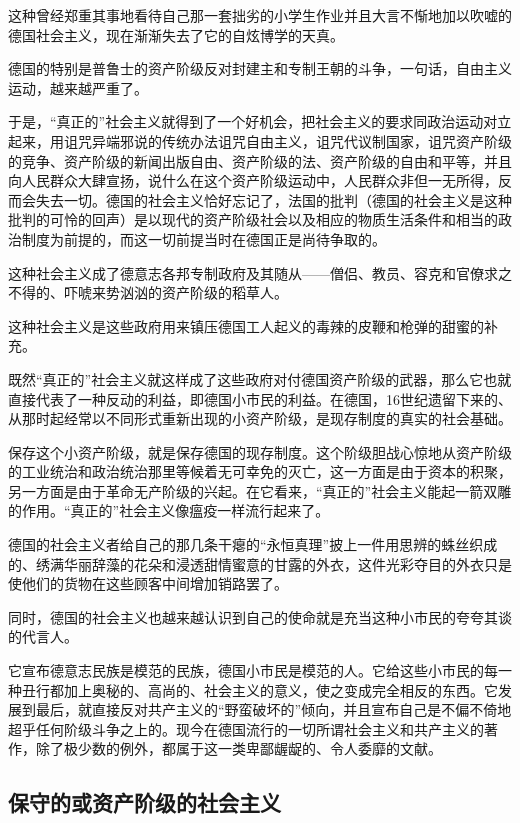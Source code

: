 \documentclass[10pt, UTF8]{book} %
\begin{document}
这种曾经郑重其事地看待自己那一套拙劣的小学生作业并且大言不惭地加以吹嘘的德国社会主义，现在渐渐失去了它的自炫博学的天真。

德国的特别是普鲁士的资产阶级反对封建主和专制王朝的斗争，一句话，自由主义运动，越来越严重了。

于是，“真正的”社会主义就得到了一个好机会，把社会主义的要求同政治运动对立起来，用诅咒异端邪说的传统办法诅咒自由主义，诅咒代议制国家，诅咒资产阶级的竞争、资产阶级的新闻出版自由、资产阶级的法、资产阶级的自由和平等，并且向人民群众大肆宣扬，说什么在这个资产阶级运动中，人民群众非但一无所得，反而会失去一切。德国的社会主义恰好忘记了，法国的批判（德国的社会主义是这种批判的可怜的回声）是以现代的资产阶级社会以及相应的物质生活条件和相当的政治制度为前提的，而这一切前提当时在德国正是尚待争取的。

这种社会主义成了德意志各邦专制政府及其随从——僧侣、教员、容克和官僚求之不得的、吓唬来势汹汹的资产阶级的稻草人。

这种社会主义是这些政府用来镇压德国工人起义的毒辣的皮鞭和枪弹的甜蜜的补充。

既然“真正的”社会主义就这样成了这些政府对付德国资产阶级的武器，那么它也就直接代表了一种反动的利益，即德国小市民的利益。在德国，16世纪遗留下来的、从那时起经常以不同形式重新出现的小资产阶级，是现存制度的真实的社会基础。

保存这个小资产阶级，就是保存德国的现存制度。这个阶级胆战心惊地从资产阶级的工业统治和政治统治那里等候着无可幸免的灭亡，这一方面是由于资本的积聚，另一方面是由于革命无产阶级的兴起。在它看来，“真正的”社会主义能起一箭双雕的作用。“真正的”社会主义像瘟疫一样流行起来了。

德国的社会主义者给自己的那几条干瘪的“永恒真理”披上一件用思辨的蛛丝织成的、绣满华丽辞藻的花朵和浸透甜情蜜意的甘露的外衣，这件光彩夺目的外衣只是使他们的货物在这些顾客中间增加销路罢了。

同时，德国的社会主义也越来越认识到自己的使命就是充当这种小市民的夸夸其谈的代言人。

它宣布德意志民族是模范的民族，德国小市民是模范的人。它给这些小市民的每一种丑行都加上奥秘的、高尚的、社会主义的意义，使之变成完全相反的东西。它发展到最后，就直接反对共产主义的“野蛮破坏的”倾向，并且宣布自己是不偏不倚地超乎任何阶级斗争之上的。现今在德国流行的一切所谓社会主义和共产主义的著作，除了极少数的例外，都属于这一类卑鄙龌龊的、令人委靡的文献。

\subsection{保守的或资产阶级的社会主义}
\end{document}
